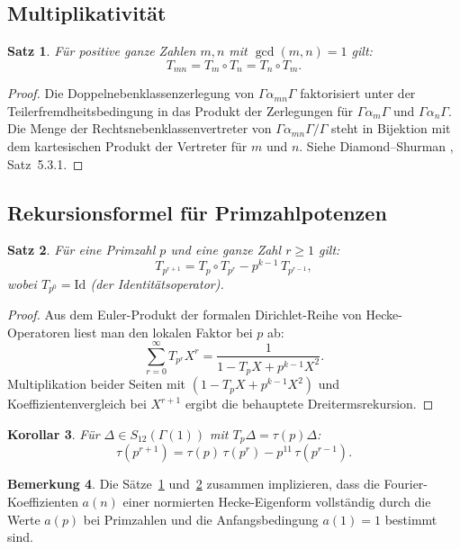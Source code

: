 \documentclass[12pt,a4paper]{amsart}
\newtheorem{theorem}{Satz}[section]
\newtheorem{korollar}[theorem]{Korollar}
\theoremstyle{definition}
\newtheorem{bemerkung}[theorem]{Bemerkung}
\begin{document}
\subsection{Multiplikativit\"at}

\begin{theorem}\label{thm:mult}
  F\"ur positive ganze Zahlen $m, n$ mit $\gcd(m,n) = 1$ gilt:
  \[
    T_{mn} = T_m \circ T_n = T_n \circ T_m.
  \]
\end{theorem}

\begin{proof}
  Die Doppelnebenklassenzerlegung von $\Gamma\alpha_{mn}\Gamma$ faktorisiert
  unter der Teilerfremdheitsbedingung in das Produkt der Zerlegungen f\"ur
  $\Gamma\alpha_m\Gamma$ und $\Gamma\alpha_n\Gamma$. Die Menge der
  Rechtsnebenklassenvertreter von $\Gamma\alpha_{mn}\Gamma/\Gamma$
  steht in Bijektion mit dem kartesischen Produkt der Vertreter f\"ur
  $m$ und $n$. Siehe Diamond--Shurman \cite{DiamondShurman}, Satz~5.3.1.
\end{proof}

\subsection{Rekursionsformel f\"ur Primzahlpotenzen}

\begin{theorem}\label{thm:rekursion}
  F\"ur eine Primzahl $p$ und eine ganze Zahl $r \ge 1$ gilt:
  \[
    T_{p^{r+1}} = T_p \circ T_{p^r} - p^{k-1}\, T_{p^{r-1}},
  \]
  wobei $T_{p^0} = \mathrm{Id}$ (der Identit\"atsoperator).
\end{theorem}

\begin{proof}
  Aus dem Euler-Produkt der formalen Dirichlet-Reihe von Hecke-Operatoren
  liest man den lokalen Faktor bei $p$ ab:
  \[
    \sum_{r=0}^{\infty} T_{p^r} X^r = \frac{1}{1 - T_p X + p^{k-1} X^2}.
  \]
  Multiplikation beider Seiten mit $(1 - T_p X + p^{k-1} X^2)$ und
  Koeffizientenvergleich bei $X^{r+1}$ ergibt die behauptete Dreitermsrekursion.
\end{proof}

\begin{korollar}
  F\"ur $\Delta \in S_{12}(\Gamma(1))$ mit $T_p \Delta = \tau(p)\Delta$:
  \[
    \tau(p^{r+1}) = \tau(p)\,\tau(p^r) - p^{11}\,\tau(p^{r-1}).
  \]
\end{korollar}

\begin{bemerkung}
  Die S\"atze~\ref{thm:mult} und~\ref{thm:rekursion} zusammen implizieren, dass
  die Fourier-Koeffizienten $a(n)$ einer normierten Hecke-Eigenform vollst\"andig
  durch die Werte $a(p)$ bei Primzahlen und die Anfangsbedingung $a(1) = 1$
  bestimmt sind.
\end{bemerkung}
\end{document}
